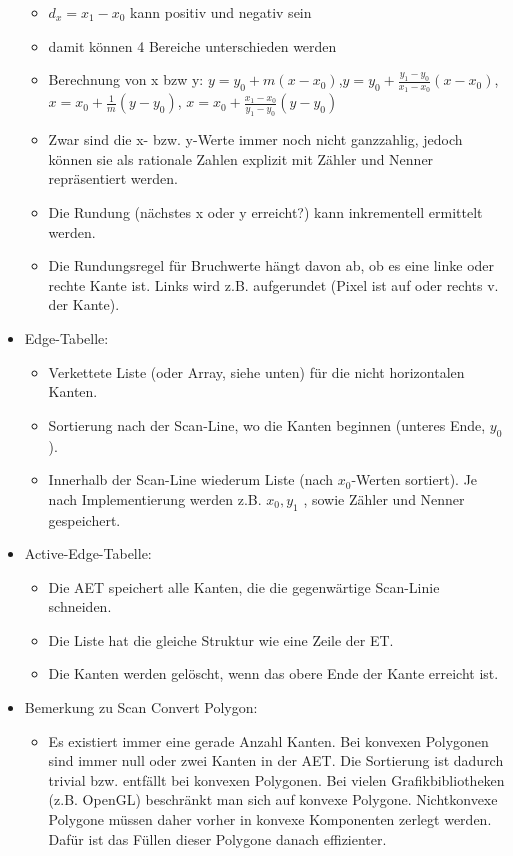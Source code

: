 \documentclass[10pt,landscape]{article}
\begin{document}
\begin{multicols}{3}
\begin{itemize}
\begin{itemize}
            \item $d_x = x_1 - x_0$ kann positiv und negativ sein
            \item damit können 4 Bereiche unterschieden werden
            \item Berechnung von x bzw y: $y=y_0+m(x-x_0)$,$y=y_0+\frac{y_1-y_0}{x_1-x_0}(x-x_0)$,$x=x_0+\frac{1}{m}(y-y_0)$, $x=x_0+\frac{x_1-x_0}{y_1-y_0}(y-y_0)$
            \item Zwar sind die x- bzw. y-Werte immer noch nicht ganzzahlig, jedoch können sie als rationale Zahlen explizit mit Zähler und Nenner repräsentiert werden.
            \item Die Rundung (nächstes x oder y erreicht?) kann inkrementell ermittelt werden.
            \item Die Rundungsregel für Bruchwerte hängt davon ab, ob es eine linke oder rechte Kante ist. Links wird z.B. aufgerundet (Pixel ist auf oder rechts v. der Kante).
          \end{itemize}
    \item Edge-Tabelle:
          \begin{itemize}
            \item  Verkettete Liste (oder Array, siehe unten) für die nicht horizontalen Kanten.
            \item  Sortierung nach der Scan-Line, wo die Kanten beginnen (unteres Ende, $y_0$ ).
            \item  Innerhalb der Scan-Line wiederum Liste (nach $x_0$-Werten sortiert). Je nach Implementierung werden z.B. $x_0 , y_1$ , sowie Zähler und Nenner gespeichert.
          \end{itemize}
    \item Active-Edge-Tabelle:
          \begin{itemize}
            \item  Die AET speichert alle Kanten, die die gegenwärtige Scan-Linie schneiden.
            \item  Die Liste hat die gleiche Struktur wie eine Zeile der ET.
            \item  Die Kanten werden gelöscht, wenn das obere Ende der Kante erreicht ist.
          \end{itemize}
    \item Bemerkung zu Scan Convert Polygon:
          \begin{itemize}
            \item Es existiert immer eine gerade Anzahl Kanten. Bei konvexen Polygonen sind immer null oder zwei Kanten in der AET. Die Sortierung ist dadurch trivial bzw. entfällt bei konvexen Polygonen. Bei vielen Grafikbibliotheken (z.B. OpenGL) beschränkt man sich auf konvexe Polygone. Nichtkonvexe Polygone müssen daher vorher in konvexe Komponenten zerlegt werden. Dafür ist das Füllen dieser Polygone danach effizienter.

\end{itemize}
\end{itemize}
\end{multicols}
\end{document}

